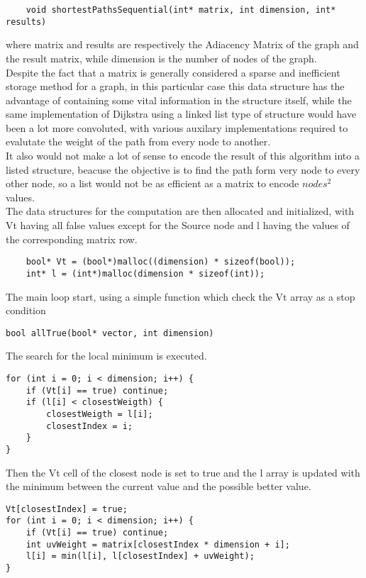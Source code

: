 \documentclass[
	a4paper, %
	12pt, %
]{class}
\begin{document}
\begin{verbatim}
    void shortestPathsSequential(int* matrix, int dimension, int* results)
\end{verbatim}

where matrix and results are respectively the Adiacency Matrix of the graph and the result matrix, while dimension is the number
of nodes of the graph.\\

Despite the fact that a matrix is generally considered a sparse and inefficient storage method for a graph, in this particular case this data structure
has the advantage of containing some vital information in the structure itself, while the same implementation of Dijkstra using a linked list type of structure 
would have been a lot more convoluted, with various auxilary implementations required to evalutate the weight of the path from every node to another.\\

It also would not make a lot of sense to encode the result of this algorithm into a listed structure, beacuse the objective is to find the path form very node to every other node,
so a list would not be as efficient as a matrix to encode $nodes^2$ values.\\

The data structures for the computation are then allocated and initialized, with Vt having all false values except for the Source node
and l having the values of the corresponding matrix row.
\begin{verbatim}
    bool* Vt = (bool*)malloc((dimension) * sizeof(bool));
    int* l = (int*)malloc(dimension * sizeof(int));
\end{verbatim}

The main loop start, using a simple function which check the Vt array as a stop condition
\begin{verbatim}
bool allTrue(bool* vector, int dimension)
\end{verbatim}

The search for the local minimum is executed.
\begin{verbatim}
for (int i = 0; i < dimension; i++) {
    if (Vt[i] == true) continue;
    if (l[i] < closestWeigth) {
        closestWeigth = l[i];
        closestIndex = i;
    }
}
\end{verbatim}

Then the Vt cell of the closest node is set to true and the l array is updated with the minimum between the current value and the
possible better value.
\begin{verbatim}
Vt[closestIndex] = true;
for (int i = 0; i < dimension; i++) {
    if (Vt[i] == true) continue;
    int uvWeight = matrix[closestIndex * dimension + i];
    l[i] = min(l[i], l[closestIndex] + uvWeight);
}
\end{verbatim}
\end{document}
